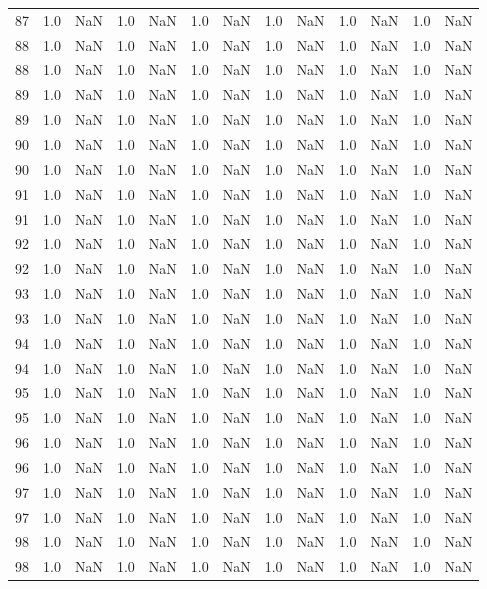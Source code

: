 \begin{tabular}{lrrrrrrrrrrrr}
87 & 1.0 & NaN & 1.0 & NaN & 1.0 & NaN & 1.0 & NaN & 1.0 & NaN & 1.0 & NaN \\
88 & 1.0 & NaN & 1.0 & NaN & 1.0 & NaN & 1.0 & NaN & 1.0 & NaN & 1.0 & NaN \\
88 & 1.0 & NaN & 1.0 & NaN & 1.0 & NaN & 1.0 & NaN & 1.0 & NaN & 1.0 & NaN \\
89 & 1.0 & NaN & 1.0 & NaN & 1.0 & NaN & 1.0 & NaN & 1.0 & NaN & 1.0 & NaN \\
89 & 1.0 & NaN & 1.0 & NaN & 1.0 & NaN & 1.0 & NaN & 1.0 & NaN & 1.0 & NaN \\
90 & 1.0 & NaN & 1.0 & NaN & 1.0 & NaN & 1.0 & NaN & 1.0 & NaN & 1.0 & NaN \\
90 & 1.0 & NaN & 1.0 & NaN & 1.0 & NaN & 1.0 & NaN & 1.0 & NaN & 1.0 & NaN \\
91 & 1.0 & NaN & 1.0 & NaN & 1.0 & NaN & 1.0 & NaN & 1.0 & NaN & 1.0 & NaN \\
91 & 1.0 & NaN & 1.0 & NaN & 1.0 & NaN & 1.0 & NaN & 1.0 & NaN & 1.0 & NaN \\
92 & 1.0 & NaN & 1.0 & NaN & 1.0 & NaN & 1.0 & NaN & 1.0 & NaN & 1.0 & NaN \\
92 & 1.0 & NaN & 1.0 & NaN & 1.0 & NaN & 1.0 & NaN & 1.0 & NaN & 1.0 & NaN \\
93 & 1.0 & NaN & 1.0 & NaN & 1.0 & NaN & 1.0 & NaN & 1.0 & NaN & 1.0 & NaN \\
93 & 1.0 & NaN & 1.0 & NaN & 1.0 & NaN & 1.0 & NaN & 1.0 & NaN & 1.0 & NaN \\
94 & 1.0 & NaN & 1.0 & NaN & 1.0 & NaN & 1.0 & NaN & 1.0 & NaN & 1.0 & NaN \\
94 & 1.0 & NaN & 1.0 & NaN & 1.0 & NaN & 1.0 & NaN & 1.0 & NaN & 1.0 & NaN \\
95 & 1.0 & NaN & 1.0 & NaN & 1.0 & NaN & 1.0 & NaN & 1.0 & NaN & 1.0 & NaN \\
95 & 1.0 & NaN & 1.0 & NaN & 1.0 & NaN & 1.0 & NaN & 1.0 & NaN & 1.0 & NaN \\
96 & 1.0 & NaN & 1.0 & NaN & 1.0 & NaN & 1.0 & NaN & 1.0 & NaN & 1.0 & NaN \\
96 & 1.0 & NaN & 1.0 & NaN & 1.0 & NaN & 1.0 & NaN & 1.0 & NaN & 1.0 & NaN \\
97 & 1.0 & NaN & 1.0 & NaN & 1.0 & NaN & 1.0 & NaN & 1.0 & NaN & 1.0 & NaN \\
97 & 1.0 & NaN & 1.0 & NaN & 1.0 & NaN & 1.0 & NaN & 1.0 & NaN & 1.0 & NaN \\
98 & 1.0 & NaN & 1.0 & NaN & 1.0 & NaN & 1.0 & NaN & 1.0 & NaN & 1.0 & NaN \\
98 & 1.0 & NaN & 1.0 & NaN & 1.0 & NaN & 1.0 & NaN & 1.0 & NaN & 1.0 & NaN \\

\end{tabular}
